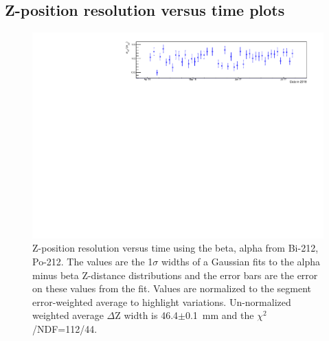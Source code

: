 \subsection{Z-position resolution versus time plots}
\begin{figure}[!h]
\centering
\includegraphics[width=1.05\textwidth]{figures/PubBiPo212ZresvsT.pdf}
\caption{\label{fig:ZresvsT212}Z-position resolution versus time using the beta, alpha from Bi-212, Po-212. The values are the 1$\sigma$ widths of a Gaussian fits to the alpha minus beta Z-distance distributions and the error bars are the error on these values from the fit. Values are normalized to the segment error-weighted average to highlight variations. Un-normalized weighted average $\Delta$Z width is 46.4$\pm$0.1~mm and the $\chi^2$/NDF=112/44.}
\end{figure}
